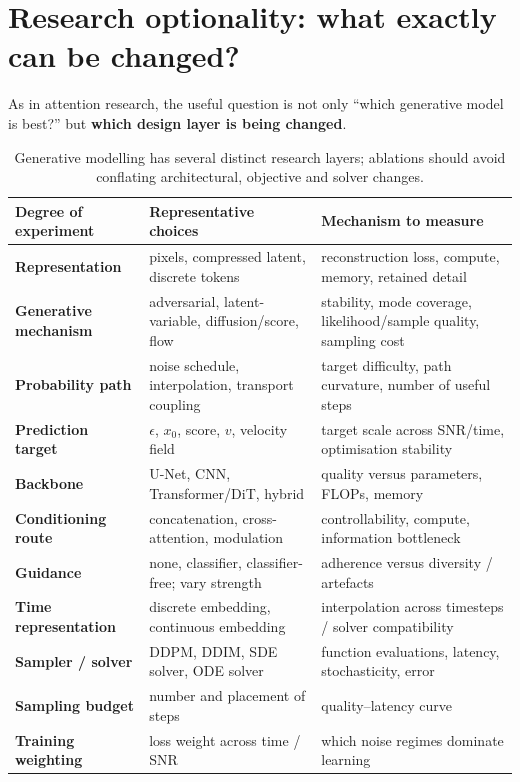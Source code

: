 \section{Research optionality: what exactly can be changed?}

As in attention research, the useful question is not only ``which generative model is best?'' but \textbf{which design layer is being changed}.

\begin{table}[H]
\centering
\small
\begin{tabularx}{\linewidth}{>{\bfseries}l X X}
\toprule
Degree of experiment & Representative choices & Mechanism to measure \\
\midrule
Representation & pixels, compressed latent, discrete tokens & reconstruction loss, compute, memory, retained detail \\
Generative mechanism & adversarial, latent-variable, diffusion/score, flow & stability, mode coverage, likelihood/sample quality, sampling cost \\
Probability path & noise schedule, interpolation, transport coupling & target difficulty, path curvature, number of useful steps \\
Prediction target & $\epsilon$, $x_0$, score, $v$, velocity field & target scale across SNR/time, optimisation stability \\
Backbone & U-Net, CNN, Transformer/DiT, hybrid & quality versus parameters, FLOPs, memory \\
Conditioning route & concatenation, cross-attention, modulation & controllability, compute, information bottleneck \\
Guidance & none, classifier, classifier-free; vary strength & adherence versus diversity / artefacts \\
Time representation & discrete embedding, continuous embedding & interpolation across timesteps / solver compatibility \\
Sampler / solver & DDPM, DDIM, SDE solver, ODE solver & function evaluations, latency, stochasticity, error \\
Sampling budget & number and placement of steps & quality--latency curve \\
Training weighting & loss weight across time / SNR & which noise regimes dominate learning \\
\bottomrule
\end{tabularx}
\caption{Generative modelling has several distinct research layers; ablations should avoid conflating architectural, objective and solver changes.}
\label{tab:generative-optionality}
\end{table}

